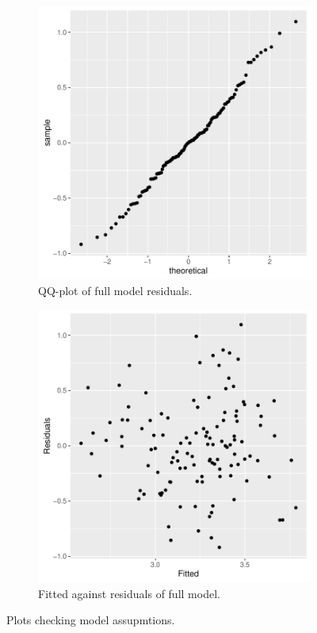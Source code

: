 \documentclass{stats_apa_style2}
\begin{document}
\begin{figure}
	\centering
	\begin{subfigure}{0.5\textwidth}
		\centering
		\includegraphics[width=\textwidth]{graphs/qq_final}
		\caption{QQ-plot of full model residuals.}
		\label{fig:qqfinal}
	\end{subfigure}%
	\begin{subfigure}{0.5\textwidth}
		\centering
		\includegraphics[width=\textwidth]{graphs/fit_res_final}
		\caption{Fitted against residuals of full model.}
		\label{fig:fitresfinal}
	\end{subfigure}
	\caption{Plots checking model assupmtions.}
\end{figure}
\end{document}
